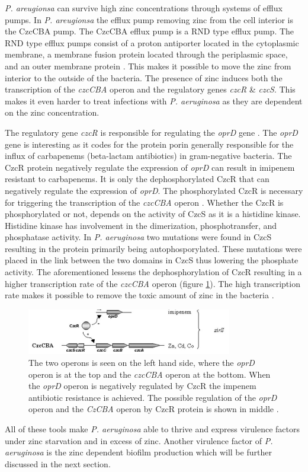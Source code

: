 \textit{P. areugionsa} can survive high zinc concentrations through systems of efflux pumps. In  \textit{P. areugionsa} the efflux pump removing zinc from the cell interior is the CzcCBA pump. The CzcCBA efflux pump is a RND type efflux pump. The RND type efflux pumps consist of a proton antiporter located in the cytoplasmic membrane, a membrane fusion protein located through the periplasmic space, and an outer membrane protein \cite{Perron2004CzcR-CzcSAeruginosa}. This makes it possible to move the zinc from interior to the outside of the bacteria. 
The presence of zinc induces both the transcription of the \textit{czcCBA} operon and the regulatory genes \textit{czcR} \& \textit{czcS}. This makes it even harder to treat infections with \textit{P. aeruginosa} as they are dependent on the zinc concentration. 

The regulatory gene \textit{czcR} is responsible for regulating the \textit{oprD} gene \cite{Perron2004CzcR-CzcSAeruginosa}. The \textit{oprD} gene is interesting as it codes for the protein porin generally responsible for the influx of carbapenems (beta-lactam antibiotics) in gram-negative bacteria. The CzcR protein negatively regulate the expression of \textit{oprD} can result in imipenem resistant to carbapenems. It is only the dephosphorylated CzcR that can negatively regulate the expression of \textit{oprD}. The phosphorylated CzcR is necessary for triggering the transcription of the \textit{czcCBA} operon \cite{Perron2004CzcR-CzcSAeruginosa}. Whether the CzcR is phosphorylated or not, depends on the activity of CzcS as it is a histidine kinase. Histidine kinase has involvement in the dimerization, phosphotransfer, and phosphatase activity. In \textit{P. aeruginosa} two mutations were found in CzcS resulting in the protein primarily being autophosporylated. These mutations were placed in the link between the two domains in CzcS thus lowering the phosphate activity. The aforementioned lessens the dephosphorylation of CzcR resulting in a higher transcription rate of the \textit{czcCBA} operon (figure \ref{figureefflux}). The high transcription rate makes it possible to remove the toxic amount of zinc in the bacteria \cite{Perron2004CzcR-CzcSAeruginosa}. 

\begin{figure}[H]
\centering
    \includegraphics[width=0.80\textwidth]{Figures/Efflux figure.png}
    \caption{\footnotesize{The two operons is seen on the left hand side, where the \textit{oprD} operon is at the top and the \textit{czcCBA} operon at the bottom. When the \textit{oprD} operon is negatively regulated by CzcR the impenem antibiotic resistance is achieved. The possible regulation of the \textit{oprD} operon and the \textit{CzCBA} operon by CzcR protein is shown in middle \cite{Perron2004CzcR-CzcSAeruginosa}.}}
    \label{figureefflux}
\end{figure}

\noindent All of these tools make \textit{P. aeruginosa} able to thrive and express virulence factors under zinc starvation and in excess of zinc. Another virulence factor of \textit{P. aeruginosa} is the zinc dependent biofilm production which will be further discussed in the next section.
